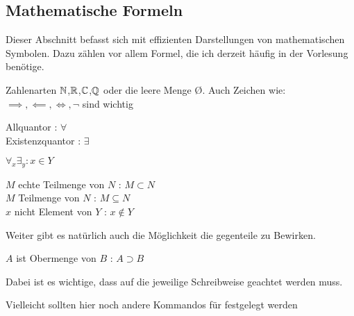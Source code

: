 \subsection{Mathematische Formeln}
Dieser Abschnitt befasst sich mit effizienten Darstellungen von mathematischen Symbolen.
Dazu zählen vor allem Formel, die ich derzeit häufig in der Vorlesung benötige.
\begin{example}	
Zahlenarten $\mathbb{N}$,$\mathbb{R}$,$\mathbb{C}$,$\mathbb{Q}$ oder 
die leere Menge \O. 
Auch Zeichen wie: $\implies, \impliedby, \iff, \neg$ sind wichtig
\end{example}
\begin{df}[Quantoren]
	Allquantor : $\forall$ \\
	Existenzquantor : $\exists$
\end{df}
\begin{example}
	$\forall _x \exists _y :  x \in Y $
\end{example}

\begin{df}[Mengensymbole]

$M$ echte Teilmenge von $N$ : $M \subset N$ \\
$M$ Teilmenge von $N$ : $M \subseteq N$ \\
 $x$ nicht Element von $Y$ : $x \notin Y$

\end{df}

Weiter gibt es natürlich auch die Möglichkeit die gegenteile zu Bewirken.

\begin{example}

$A$ ist Obermenge von $B$ : $A \supset B$

\end{example}

Dabei ist es wichtige, dass auf die jeweilige Schreibweise geachtet werden muss.

\begin{note}
	Vielleicht sollten hier noch andere Kommandos für festgelegt werden
\end{note}

